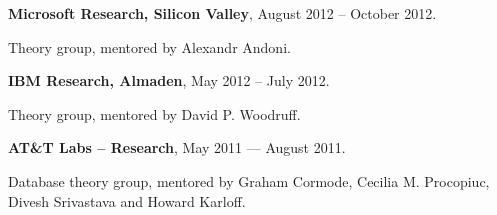 \documentclass[11pt]{article}
\newenvironment{innerlist}[1][\enskip\textbullet]%
        {\begin{compactitem}[#1]}{\end{compactitem}}
\begin{document}
\textbf{Microsoft Research, Silicon Valley},  August 2012 -- October 2012.

Theory group, mentored by Alexandr Andoni.
\begin{comment}
\begin{innerlist}
\item MapReduce algorithms for large-scale geometric problems, including minimum-spanning trees, single-linkage clustering and bichromatic matching  (with A. Andoni, A. Nikolov and K. Onak, STOC'14).
\end{innerlist}
\end{comment}
\medskip

\textbf{IBM Research, Almaden},  May 2012 -- July 2012.

Theory group, mentored by David P. Woodruff. 
\begin{comment}
\begin{innerlist}
\item Optimal bounds on one-way communication and space complexity of sketching multiple instances of data  (with M. Molinaro and D. Woodruff, SODA'13). 
\item A protocol for computing the intersection of distributed databases with almost optimal round vs. communication tradeoffs  (with D. Woodruff, PODC'14; U.S. patent 9438704).
\end{innerlist}
\end{comment}
\medskip

\textbf{AT\&T Labs -- Research},  May 2011 --- August 2011.

Database theory group, mentored by Graham Cormode, Cecilia M. Procopiuc, Divesh Srivastava and Howard Karloff.

\begin{comment}
\begin{innerlist}
\item Design and implementation of efficient differentially private mechanisms for linear queries
 (with G. Cormode, M. Procopiuc and D. Srivastava, ICDE'13) %
\end{innerlist}
\end{comment}
\end{document}
